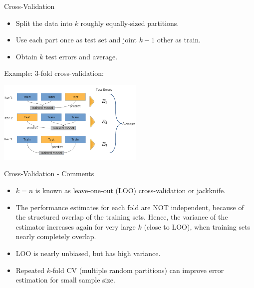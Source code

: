 \begin{frame}{Cross-Validation}

\begin{itemize}
\item
  Split the data into \(k\) roughly equally-sized partitions.
\item
  Use each part once as test set and joint \(k-1\) other as train.
\item
  Obtain \(k\) test errors and average.
\end{itemize}

Example: 3-fold cross-validation:

\begin{center}
\includegraphics[width=7cm]{plots/crossvalidation.png}
\end{center}

\end{frame}


\begin{frame}{Cross-Validation - Comments}

\begin{itemize}
\item
  \(k = n\) is known as leave-one-out (LOO) cross-validation or
  jackknife.
\item
  The performance estimates for each fold are NOT independent, because
  of the structured overlap of the training sets. Hence, the variance of
  the estimator increases again for very large \(k\) (close to LOO),
  when training sets nearly completely overlap.
\item
  LOO is nearly unbiased, but has high variance.
\item
  Repeated \(k\)-fold CV (multiple random partitions) can improve error
  estimation for small sample size.
\end{itemize}

\end{frame}


